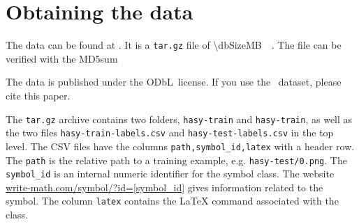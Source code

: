 
\appendix
\section*{Obtaining the data}
The data can be found at \dbDownloadURL. It is a \verb+tar.gz+ file of
\SI{\dbSizeMB}{\mega\byte}. The file can be verified with the MD5sum

\texttt{\dbMDfivesum}

The data is published under the ODbL~license. If you use
the \dbName~dataset, please cite this paper.

The \verb+tar.gz+ archive contains two folders, \verb+hasy-train+ and
\verb+hasy-train+, as well as the two files \verb+hasy-train-labels.csv+
and \verb+hasy-test-labels.csv+ in the top level. The CSV files have the
columns \verb+path,symbol_id,latex+ with a header row. The \verb+path+ is the
relative path to a training example, e.g. \verb+hasy-test/0.png+. The
\verb+symbol_id+ is an internal numeric identifier for the symbol class. The
website \href{http://write-math.com/symbol/?id=968}{write-math.com/symbol/?id=[symbol\_id]}
gives information related to the symbol. The column \verb+latex+ contains the
\LaTeX{} command associated with the class.
\onecolumn

\twocolumn